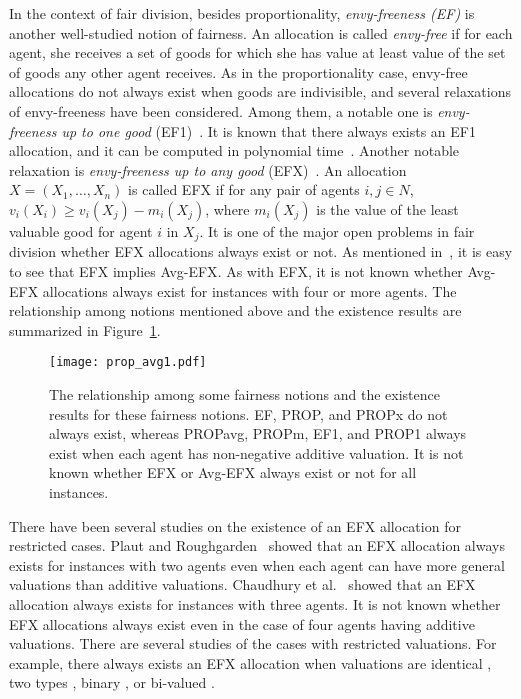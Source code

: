 \documentclass[11pt]{article}
\newcommand{\PROPavg}{\textsf{PROPavg}\xspace}
\newcommand{\PROPm}{\textsf{PROPm}\xspace}
\newcommand{\PROPx}{\textsf{PROPx}\xspace}
\newcommand{\PROP}{\textsf{PROP}\xspace}
\newcommand{\EFX}{\textsf{EFX}\xspace}
\newcommand{\EF}{\textsf{EF}\xspace}
\begin{document}
In the context of fair division, besides proportionality, {\it envy-freeness (\EF)} is another well-studied notion of fairness. 
An allocation is called {\it envy-free} if for each agent, she receives a set of goods for which she has value at least value of the set of goods any other agent receives.
As in the proportionality case, envy-free allocations do not always exist when goods are indivisible, and several relaxations of envy-freeness have been considered.
Among them, a notable one is {\it envy-freeness up to one good} (\textsf{EF}1)~\cite{budish2011combinatorial}. 
It is known that there always exists an \textsf{EF}1 allocation, and it can be computed in polynomial time~\cite{lipton2004approximately}. 
Another notable relaxation is {\it envy-freeness up to any good} (\EFX)~\cite{caragiannis2019unreasonable}.
An allocation $X=(X_1,\ldots ,X_n)$ is called \EFX if for any pair of agents $i,j \in N$, $v_i(X_i) \ge v_i(X_j)-m_i(X_j)$, where $m_i(X_j)$ is the value of the least valuable good for agent $i$ in $X_j$.
It is one of the major open problems in fair division whether \EFX allocations always exist or not. 
As mentioned in~\cite{baklanov2021achieving}, it is easy to see that \EFX implies \textsf{Avg-EFX}.
As with \EFX, it is not known whether \textsf{Avg-EFX} allocations always exist for instances with four or more agents.
The relationship among notions mentioned above and the existence results are summarized in Figure~\ref{fig: 1}.
\begin{figure}[tbp]
  \begin{center}
   \texttt{[image: prop\_avg1.pdf]}
 \end{center}
  \caption{The relationship among some fairness notions and the existence results for these fairness notions. \EF, \PROP, and \PROPx do not always exist, whereas \PROPavg, \PROPm, {\EF}1, and {\PROP}1 always exist when each agent has non-negative additive valuation. It is not known whether \EFX or \textsf{Avg-EFX} always exist or not for all instances.} 
  \label{fig: 1}
\end{figure}
There have been several studies on the existence of  an \EFX allocation for restricted cases.
Plaut and Roughgarden~\cite{plaut2020almost} showed that an \EFX allocation always exists for instances with two agents even when each agent can have more general valuations than additive valuations.
Chaudhury et al.~\cite{chaudhury2020efx} showed that an \EFX allocation always exists for instances with three agents.
It is not known whether \EFX allocations always exist even in the case of four agents having additive valuations.
There are several studies of the cases with restricted valuations.  
For example, there always exists an \EFX allocation when valuations are identical \cite{plaut2020almost}, two types \cite{mahara2020existence, mahara2021extension}, binary \cite{barman2018greedy, darmann2015maximizing}, or bi-valued \cite{amanatidis2021maximum}.
\end{document}
